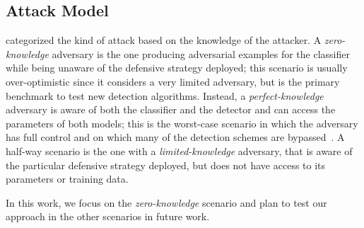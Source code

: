 \subsection{Attack Model}
\label{subsec:attack-model}

\citet{biggio2013evasion} categorized the kind of attack based on the knowledge of the attacker.
A \emph{zero-knowledge} adversary is the one producing adversarial examples for the classifier while being unaware of the defensive strategy deployed;
this scenario is usually over-optimistic since it considers a very limited adversary, but is the primary benchmark to test new detection algorithms.
Instead, a \emph{perfect-knowledge} adversary is aware of both the classifier and the detector and can access the parameters of both models;
this is the worst-case scenario in which the adversary has full control and on which many of the detection schemes are bypassed~\cite{carlini2017adversarial}.
A half-way scenario is the one with a \emph{limited-knowledge} adversary, that is aware of the particular defensive strategy deployed, but does not have access to its parameters or training data.

In this work, we focus on the \emph{zero-knowledge} scenario and plan to test our approach in the other scenarios in future work.



%
%

